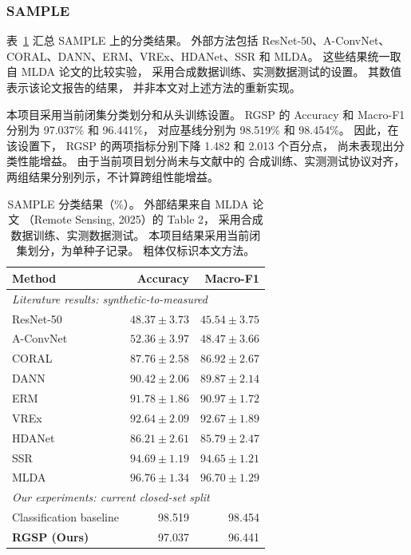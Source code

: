 \documentclass[journal]{IEEEtran}
\begin{document}
\subsubsection{SAMPLE}
\label{sec:sample_results}

表~\ref{tab:sample_comparison}
汇总 SAMPLE 上的分类结果。
外部方法包括 ResNet-50、A-ConvNet、
CORAL、DANN、ERM、VREx、HDANet、SSR 和 MLDA。
这些结果统一取自 MLDA 论文的比较实验，
采用合成数据训练、实测数据测试的设置。
其数值表示该论文报告的结果，
并非本文对上述方法的重新实现。

本项目采用当前闭集分类划分和从头训练设置。
RGSP 的 Accuracy 和 Macro-F1
分别为 97.037\% 和 96.441\%，
对应基线分别为 98.519\% 和 98.454\%。
因此，在该设置下，
RGSP 的两项指标分别下降
1.482 和 2.013 个百分点，
尚未表现出分类性能增益。
由于当前项目划分尚未与文献中的
合成训练、实测测试协议对齐，
两组结果分别列示，不计算跨组性能增益。

\begin{table}[!t]
\centering
\small
\setlength{\tabcolsep}{5pt}
\caption{SAMPLE 分类结果（\%）。
外部结果来自 MLDA 论文
（Remote Sensing, 2025）的 Table 2，
采用合成数据训练、实测数据测试。
本项目结果采用当前闭集划分，为单种子记录。
粗体仅标识本文方法。}
\label{tab:sample_comparison}
\begin{tabular}{lrr}
\toprule
Method & Accuracy & Macro-F1 \\
\midrule
\multicolumn{3}{l}{
\textit{Literature results: synthetic-to-measured}} \\
ResNet-50
& $48.37 \pm 3.73$ & $45.54 \pm 3.75$ \\
A-ConvNet
& $52.36 \pm 3.97$ & $48.47 \pm 3.66$ \\
CORAL
& $87.76 \pm 2.58$ & $86.92 \pm 2.67$ \\
DANN
& $90.42 \pm 2.06$ & $89.87 \pm 2.14$ \\
ERM
& $91.78 \pm 1.86$ & $90.97 \pm 1.72$ \\
VREx
& $92.64 \pm 2.09$ & $92.67 \pm 1.89$ \\
HDANet
& $86.21 \pm 2.61$ & $85.79 \pm 2.47$ \\
SSR
& $94.69 \pm 1.19$ & $94.65 \pm 1.21$ \\
MLDA
& $96.76 \pm 1.34$ & $96.70 \pm 1.29$ \\

\midrule
\multicolumn{3}{l}{
\textit{Our experiments: current closed-set split}} \\
Classification baseline
& 98.519 & 98.454 \\
\textbf{RGSP (Ours)}
& 97.037 & 96.441 \\
\bottomrule
\end{tabular}
\end{table}
\end{document}
